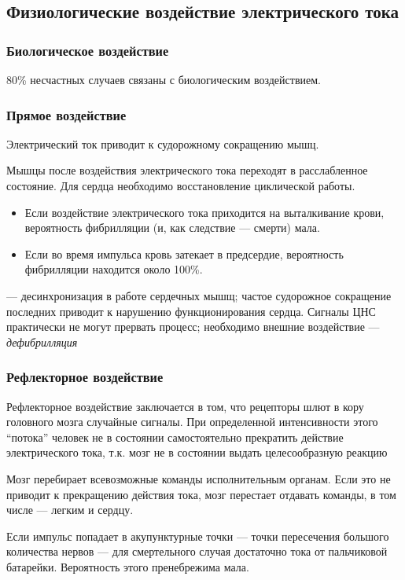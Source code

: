 \documentclass[a4paper, 14pt]{extarticle}
\begin{document}
\subsection{Физиологические воздействие электрического тока}
\subsubsection{Биологическое воздействие}
80\% несчастных случаев связаны с биологическим воздействием.

\subsubsection*{Прямое воздействие}
Электрический ток приводит к судорожному сокращению мышц.

Мышцы после воздействия электрического тока переходят в расслабленное состояние. Для сердца необходимо восстановление циклической работы. 

\begin{itemize}
    \item Если воздействие электрического тока приходится на выталкивание крови, вероятность фибрилляции (и, как следствие --- смерти) мала. 
    \item Если во время импульса кровь затекает в предсердие, вероятность фибрилляции находится около 100\%.
\end{itemize}
 --- десинхронизация в работе сердечных мышщ; частое судорожное сокращение последних приводит к нарушению функционирования сердца. Сигналы ЦНС практически не могут прервать процесс; необходимо внешние воздействие --- \textit{дефибрилляция}

\subsubsection*{Рефлекторное воздействие}
Рефлекторное воздействие заключается в том, что рецепторы шлют в кору головного мозга случайные сигналы. При определенной интенсивности этого ``потока'' человек не в состоянии самостоятельно прекратить действие электрического тока, т.к. мозг не в состоянии выдать целесообразную реакцию

Мозг перебирает всевозможные команды исполнительным органам. Если это не приводит к прекращению действия тока, мозг перестает отдавать команды, в том числе --- легким и сердцу.

Если импульс попадает в акупунктурные точки --- точки пересечения большого количества нервов --- для смертельного случая достаточно тока от пальчиковой батарейки. Вероятность этого пренебрежима мала.
\end{document}
